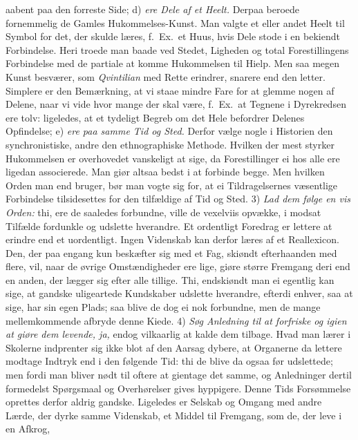 \documentclass[12pt,a4paper]{article}
\newcommand{\opage}[1]{\marginnote{\footnotesize\textit{[#1]}}}
\begin{document}
aabent paa den forreste Side; d) \emph{ere Dele af et Heelt.} Derpaa beroede fornemmelig
de Gamles Hukommelses-Kunst. Man valgte et eller andet Heelt til Symbol for det, der
skulde læres, f.~Ex.\ et Huus, hvis Dele stode i en bekiendt Forbindelse. Heri troede man
baade ved Stedet, Ligheden og total Forestillingens Forbindelse med de partiale at komme
Hukommelsen til Hielp. Men
\opage{116} saa megen Kunst besværer, som \emph{Qvintilian} med Rette erindrer, snarere end den
letter. Simplere er den Bemærkning, at vi staae mindre Fare for at glemme nogen af
Delene, naar vi vide hvor mange der skal være, f.~Ex.\ at Tegnene i Dyrekredsen ere tolv:
ligeledes, at et tydeligt Begreb om det Hele befordrer Delenes Opfindelse; e) \emph{ere
paa samme Tid og Sted.} Derfor vælge nogle i Historien den synchronistiske, andre den
ethnographiske Methode. Hvilken der mest styrker Hukommelsen er overhovedet vanskeligt at
sige, da Forestillinger ei hos alle ere ligedan associerede. Man giør altsaa bedst i at
forbinde begge. Men hvilken Orden man end bruger, bør man vogte sig for, at ei
Tildragelsernes væsentlige Forbindelse tilsidesettes for den tilfældige af Tid og Sted.
3) \emph{Lad dem følge en vis Orden:} thi, ere de saaledes forbundne, ville de vexelviis
opvække, i modsat Tilfælde fordunkle og udslette hverandre. Et ordentligt Foredrag er
lettere at erindre end et uordentligt. Ingen Videnskab kan derfor læres af et
Reallexicon. Den, der paa engang kun beskæfter sig med et Fag, skiøndt efterhaanden med
flere, vil, naar de øvrige Omstændigheder ere lige, giøre større Fremgang deri end en
anden, der lægger sig efter alle tillige. Thi, endskiøndt man ei egentlig kan sige, at
gandske uligeartede Kundskaber udslette hverandre, efterdi enhver, saa at sige, har sin
egen Plads; saa blive de dog ei nok forbundne, men de mange mellemkommende afbryde
\opage{117} denne Kiede. 4) \emph{Søg Anledning til at forfriske og igien at giøre dem levende, ja,}
endog vilkaarlig at kalde dem tilbage. Hvad man lærer i Skolerne indprenter sig ikke blot
af den Aarsag dybere, at Organerne da lettere modtage Indtryk end i den følgende Tid: thi
de blive da ogsaa før udslettede; men fordi man bliver nødt til oftere at gientage det
samme, og Anledninger dertil formedelst Spørgsmaal og Overhørelser gives hyppigere. Denne
Tids Forsømmelse oprettes derfor aldrig gandske. Ligeledes er Selskab og Omgang med andre
Lærde, der dyrke samme Videnskab, et Middel til Fremgang, som de, der leve i en Afkrog,
\end{document}
